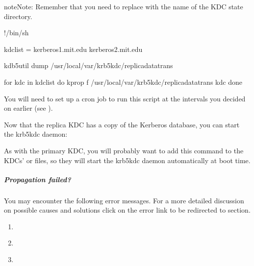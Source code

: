 \documentclass[letterpaper,10pt,english]{sphinxmanual}
\begin{document}
\begin{sphinxadmonition}{note}{Note:}
Remember that you need to replace 
with the name of the KDC state directory.
\end{sphinxadmonition}

%
\begin{sphinxVerbatim}[commandchars=\\\{\}]
\PYGZsh{}!/bin/sh

kdclist = \PYGZdq{}kerberos\PYGZhy{}1.mit.edu kerberos\PYGZhy{}2.mit.edu\PYGZdq{}

kdb5\PYGZus{}util dump /usr/local/var/krb5kdc/replica\PYGZus{}datatrans

for kdc in \PYGZdl{}kdclist
do
    kprop \PYGZhy{}f /usr/local/var/krb5kdc/replica\PYGZus{}datatrans \PYGZdl{}kdc
done
\end{sphinxVerbatim}

You will need to set up a cron job to run this script at the intervals
you decided on earlier (see {\hyperref[\detokenize{admin/realm_config:db-prop}]{}}).

Now that the replica KDC has a copy of the Kerberos database, you can
start the krb5kdc daemon:

%
\begin{sphinxVerbatim}[commandchars=\\\{\}]
 
\end{sphinxVerbatim}

As with the primary KDC, you will probably want to add this command to
the KDCs’  or  files, so they will start
the krb5kdc daemon automatically at boot time.


\subparagraph{Propagation failed?}
\label{\detokenize{admin/install_kdc:propagation-failed}}
You may encounter the following error messages. For a more detailed
discussion on possible causes and solutions click on the error link
to be redirected to {\hyperref[\detokenize{admin/troubleshoot:troubleshoot}]{}} section.
\begin{enumerate}
\item {} 
{\hyperref[\detokenize{admin/troubleshoot:kprop-no-route}]{}}

\item {} 
{\hyperref[\detokenize{admin/troubleshoot:kprop-con-refused}]{}}

\item {} 
{\hyperref[\detokenize{admin/troubleshoot:kprop-sendauth-exchange}]{}}

\end{enumerate}
\end{document}
